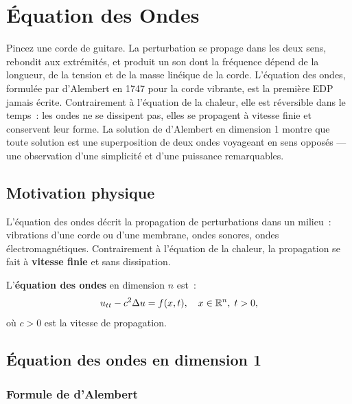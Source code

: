 \chapter{\'Equation des Ondes}
\label{ch:ondes}

Pincez une corde de guitare. La perturbation se propage dans les deux sens, rebondit aux extr\'emit\'es, et produit un son dont la fr\'equence d\'epend de la longueur, de la tension et de la masse lin\'eique de la corde. L'\'equation des ondes, formul\'ee par d'Alembert en 1747 pour la corde vibrante, est la premi\`ere EDP jamais \'ecrite. Contrairement \`a l'\'equation de la chaleur, elle est r\'eversible dans le temps~: les ondes ne se dissipent pas, elles se propagent \`a vitesse finie et conservent leur forme. La solution de d'Alembert en dimension 1 montre que toute solution est une superposition de deux ondes voyageant en sens oppos\'es --- une observation d'une simplicit\'e et d'une puissance remarquables.

\section{Motivation physique}

L'\'equation des ondes d\'ecrit la propagation de perturbations dans un
milieu~: vibrations d'une corde ou d'une membrane, ondes sonores,
ondes \'electromagn\'etiques. Contrairement \`a l'\'equation de la chaleur,
la propagation se fait \`a \textbf{vitesse finie} et sans dissipation.

\begin{definition}
L'\textbf{\'equation des ondes} en dimension $n$ est~:
\begin{equation}\label{eq:ondes}
    u_{tt} - c^2 \Delta u = f(x,t), \quad x \in \mathbb{R}^n,\; t > 0,
\end{equation}
o\`u $c > 0$ est la vitesse de propagation.
\end{definition}

\section{\'Equation des ondes en dimension 1}

\subsection{Formule de d'Alembert}

